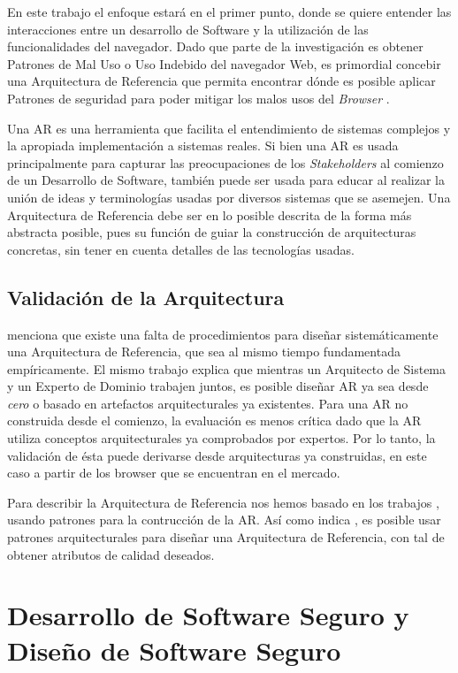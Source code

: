 En este trabajo el enfoque estará en el primer punto, donde se quiere entender las interacciones entre un desarrollo de Software y la utilización de las funcionalidades del navegador. Dado que parte de la investigación es obtener Patrones de Mal Uso o Uso Indebido del navegador Web, es primordial concebir una Arquitectura de Referencia que permita encontrar dónde es posible aplicar Patrones de seguridad para poder mitigar los malos usos del \textit{Browser} \cite{Submitted2014}. 

Una AR es una herramienta que facilita el entendimiento de sistemas complejos y la apropiada implementación a sistemas reales. Si bien una AR es usada principalmente para capturar las preocupaciones de los \textit{Stakeholders} al comienzo de un Desarrollo de Software, también puede ser usada para educar al realizar la unión de ideas y terminologías usadas por diversos sistemas que se asemejen. Una Arquitectura de Referencia debe ser en lo posible descrita de la forma más abstracta posible, pues su función de guiar la construcción de arquitecturas concretas, sin tener en cuenta detalles de las tecnologías usadas. 

\subsection{Validación de la Arquitectura}
    \cite{Galster2011a} menciona que existe una falta de procedimientos para diseñar sistemáticamente una Arquitectura de Referencia, que sea al mismo tiempo fundamentada empíricamente. El mismo trabajo explica que mientras un Arquitecto de Sistema y un Experto de Dominio trabajen juntos, es posible diseñar AR ya sea desde \textit{cero} o basado en artefactos arquitecturales ya existentes. Para una AR no construida desde el comienzo, la evaluación es menos crítica dado que la AR utiliza conceptos arquitecturales ya comprobados por expertos. Por lo tanto, la validación de ésta puede derivarse desde arquitecturas ya construidas, en este caso a partir de los browser que se encuentran en el mercado.

    Para describir la Arquitectura de Referencia nos hemos basado en los trabajos \cite{Hashizume2014Reference, Submitted2014}, usando patrones para la contrucción de la AR. Así como indica \cite{Bass2012}, es posible usar patrones arquitecturales para diseñar una Arquitectura de Referencia, con tal de obtener atributos de calidad deseados.



\section{Desarrollo de Software Seguro y Diseño de Software Seguro}
\label{chap2:SSD}

